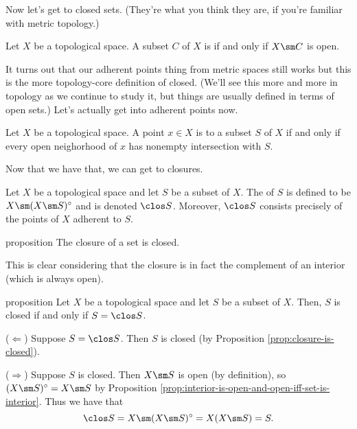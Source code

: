 \documentclass[class=article, crop=false]{standalone}
\begin{document}
Now let's get to closed sets. (They're what you think they are, if you're familiar with metric topology.)

\begin{defn}
  Let $X$ be a topological space. A subset $C$ of $X$ is  if and only if $X\sm C$ is open.
\end{defn}
\noindent It turns out that our adherent points thing from metric spaces still works but this is the more topology-core definition of closed. (We'll see this more and more in topology as we continue to study it, but things are usually defined in terms of open sets.) Let's actually get into adherent points now.

\begin{defn}
  Let $X$ be a topological space. A point $x \in X$ is  to a subset $S$ of $X$ if and only if every open neighorhood of $x$ has nonempty intersection with $S$.
\end{defn}

Now that we have that, we can get to closures.

\begin{defn}
  Let $X$ be a topological space and let $S$ be a subset of $X$. The  of $S$ is defined to be $X \sm (X \sm S)^\circ$ and is denoted $\clos S$. Moreover, $\clos S$ consists precisely of the points of $X$ adherent to $S$.
\end{defn}

\begin{result}{proposition}{\label{prop:closure-is-closed}}
  The closure of a set is closed.
\end{result}
\begin{pf}
  This is clear considering that the closure is in fact the complement of an interior (which is always open).
\end{pf}

\begin{result}{proposition}
  Let $X$ be a topological space and let $S$ be a subset of $X$. Then, $S$ is closed if and only if $S = \clos S$.
\end{result}
\begin{pf}
  ($\Leftarrow$) Suppose $S  = \clos S$. Then $S$ is closed (by Proposition \ref{prop:closure-is-closed}).

  ($\Rightarrow$) Suppose $S$ is closed. Then $X \sm S$ is open (by definition), so $(X \sm S)^\circ = X \sm S$ by Proposition \ref{prop:interior-is-open-and-open-iff-set-is-interior}. Thus we have that
    \[
      \clos S = X \sm (X \sm S)^\circ = X (X \sm S) = S.
    \]
\end{pf}
\end{document}
